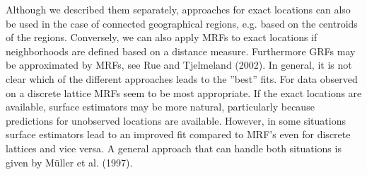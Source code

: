 \documentclass[11pt,a4paper,twoside]{bayesxarticle}
\begin{document}
Although we described them separately, approaches for exact
locations can also be used in the case of connected geographical
regions, e.g. based on the centroids of the regions. Conversely,
we can also apply MRFs to exact locations if neighborhoods are
defined based on a distance measure. Furthermore GRFs may be
approximated by MRFs, see Rue and Tjelmeland (2002). In general, it is
not clear which of the different approaches leads to the ''best''
fits. For data observed on a discrete lattice MRFs seem to be most
appropriate. If the exact locations are available, surface
estimators may be more natural, particularly because predictions
for unobserved locations are available. However, in some
situations surface estimators lead to an improved fit compared to
MRF's even for discrete lattices and vice versa. A general
approach that can handle both situations is given by
M\"{u}ller et al. (1997).
\end{document}
